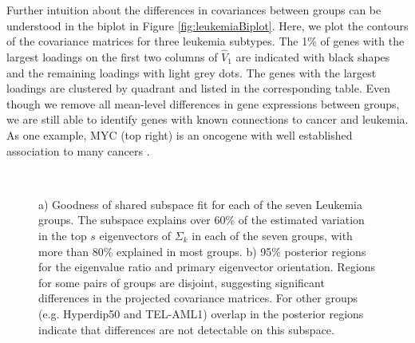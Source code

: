 \documentclass[12pt]{article}
\begin{document}
Further intuition about the differences in covariances between groups
can be understood in the biplot in Figure \ref{fig:leukemiaBiplot}.
Here, we plot the contours of the covariance matrices for three
leukemia subtypes. The 1\% of genes with the largest loadings on the
first two columns of $\hat{V}_1$ are indicated with black shapes and the
remaining loadings with light grey dots.  The genes with the largest
loadings are clustered by quadrant and listed in the corresponding
table.  Even though we remove all mean-level differences in gene
expressions between groups, we are still able to identify genes with
known connections to cancer and leukemia.  As one example, MYC (top
right) is an oncogene with well established association to many
cancers \citep{Dang2012}.

\begin{figure}[t]
    \centering
    ~ %
      \caption{a) Goodness of shared subspace fit for each of the
        seven Leukemia groups.  The subspace explains over $60\%$ of
        the estimated variation in the top $s$ eigenvectors of
        $\Sigma_k$ in each of the seven groups, with more than 80\%
        explained in most groups.  b) 95\% posterior regions for the
        eigenvalue ratio and primary eigenvector orientation.  Regions
        for some pairs of groups are disjoint, suggesting significant
        differences in the projected covariance matrices.  For other
        groups (e.g. Hyperdip50 and TEL-AML1) overlap in the posterior
        regions indicate that differences are not detectable on this
        subspace. }
\label{fig:leukemia}
\end{figure}
\end{document}
